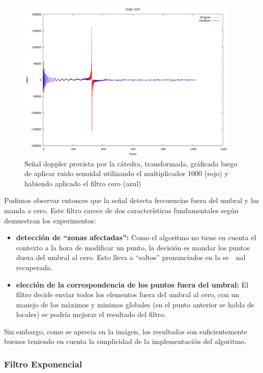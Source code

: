 \begin{figure}
\begin {center}
\includegraphics[width=299pt]{imagenes/dopp1024-sin100-zero-spec.png}
\end {center}
\caption{Se\~nal doppler provista por la c\'atedra, transformada, gr\'aficada
luego de aplicar ruido senoidal utilizando el multiplicador 1000 (rojo) y 
habiendo aplicado el filtro cero (azul)}
\label{fig:SinProm}
\end{figure}

Pudimos observar entonces que la se\~nal detecta frecuencias fuera del umbral y
las manda a cero. Este filtro carece de dos caracter\'isticas fundamentales
seg\'un demuestran los experimentos:

\begin{itemize}
	\item {\bf detecci\'on de ``zonas afectadas'':} Como el algoritmo no tiene en
cuenta el contexto a la hora de modificar un punto, la decisi\'on es mandar los
puntos duera del umbral al cero. Esto lleva a ``saltos'' pronunciados en la se\
~nal recuperada.

	\item {\bf elecci\'on de la correspondencia de los puntos fuera del umbral:}
El filtro decide enviar todos los elementos fuera del umbral al cero, con un
manejo de los m\'aximos y minimos globales (en el punto anterior se habla de
locales) se podr\'ia mejorar el resultado del filtro.
\end{itemize}

Sin embargo, como se aprecia en la im\'agen, los resultados son suficientemente
buenos teniendo en cuenta la simplicidad de la implementaci\'on del algoritmo.

\subsubsection{Filtro Exponencial}


